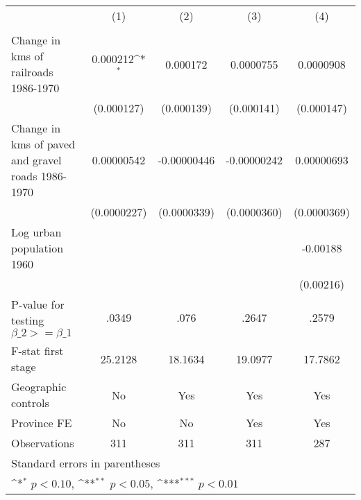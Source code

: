 {
\def\sym#1{\ifmmode^{#1}\else\(^{#1}\)\fi}
\begin{tabular}{l*{4}{c}}
\hline\hline
                &\multicolumn{1}{c}{(1)}&\multicolumn{1}{c}{(2)}&\multicolumn{1}{c}{(3)}&\multicolumn{1}{c}{(4)}\\
                &\multicolumn{1}{c}{}&\multicolumn{1}{c}{}&\multicolumn{1}{c}{}&\multicolumn{1}{c}{}\\
\hline
Change in kms of railroads 1986-1970& 0.000212\sym{*}  & 0.000172         &0.0000755         &0.0000908         \\
                &(0.000127)         &(0.000139)         &(0.000141)         &(0.000147)         \\
[1em]
Change in kms of paved and gravel roads 1986-1970&0.00000542         &-0.00000446         &-0.00000242         &0.00000693         \\
                &(0.0000227)         &(0.0000339)         &(0.0000360)         &(0.0000369)         \\
[1em]
Log urban population 1960&                  &                  &                  & -0.00188         \\
                &                  &                  &                  &(0.00216)         \\
\hline
P-value for testing $\beta\_{2} >= \beta\_{1}$&    .0349         &     .076         &    .2647         &    .2579         \\
F-stat first stage&  25.2128         &  18.1634         &  19.0977         &  17.7862         \\
Geographic controls&       No         &      Yes         &      Yes         &      Yes         \\
Province FE     &       No         &       No         &      Yes         &      Yes         \\
Observations    &      311         &      311         &      311         &      287         \\
\hline\hline
\multicolumn{5}{l}{\footnotesize Standard errors in parentheses}\\
\multicolumn{5}{l}{\footnotesize \sym{*} \(p<0.10\), \sym{**} \(p<0.05\), \sym{***} \(p<0.01\)}\\
\end{tabular}
}

